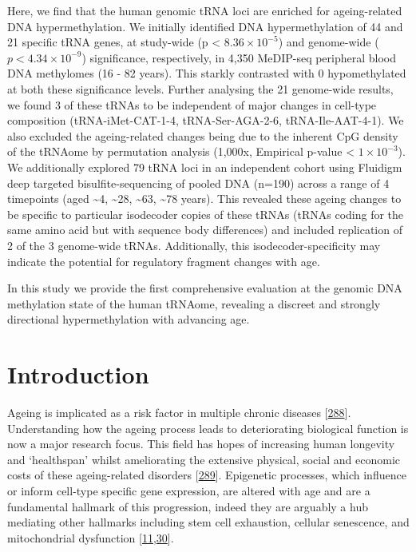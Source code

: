 \documentclass[
]{book}
\begin{document}
Here, we find that the human genomic tRNA loci are enriched for ageing-related DNA hypermethylation.
We initially identified DNA hypermethylation of 44 and 21 specific tRNA genes, at study-wide (p \textless{} \(8.36\times10^{-5}\)) and genome-wide (\(p < 4.34\times10^{-9}\)) significance, respectively, in 4,350 MeDIP-seq peripheral blood DNA methylomes (16 - 82 years).
This starkly contrasted with 0 hypomethylated at both these significance levels.
Further analysing the 21 genome-wide results, we found 3 of these tRNAs to be independent of major changes in cell-type composition (tRNA-iMet-CAT-1-4, tRNA-Ser-AGA-2-6, tRNA-Ile-AAT-4-1).
We also excluded the ageing-related changes being due to the inherent CpG density of the tRNAome by permutation analysis (1,000x, Empirical p-value \textless{} \(1\times10^{-3}\)).
We additionally explored 79 tRNA loci in an independent cohort using Fluidigm deep targeted bisulfite-sequencing of pooled DNA (n=190) across a range of 4 timepoints (aged \textasciitilde4, \textasciitilde28, \textasciitilde63, \textasciitilde78 years).
This revealed these ageing changes to be specific to particular isodecoder copies of these tRNAs (tRNAs coding for the same amino acid but with sequence body differences) and included replication of 2 of the 3 genome-wide tRNAs.
Additionally, this isodecoder-specificity may indicate the potential for regulatory fragment changes with age.

In this study we provide the first comprehensive evaluation at the genomic DNA methylation state of the human tRNAome, revealing a discreet and strongly directional hypermethylation with advancing age.

\newpage

\hypertarget{tRNA-Introduction}{%
\section{Introduction}\label{tRNA-Introduction}}

Ageing is implicated as a risk factor in multiple chronic diseases {[}\protect\hyperlink{ref-Partridge2018}{288}{]}.
Understanding how the ageing process leads to deteriorating biological function is now a major research focus. This field has hopes of increasing human longevity and `healthspan' whilst ameliorating the extensive physical, social and economic costs of these ageing-related disorders {[}\protect\hyperlink{ref-Campisi2019}{289}{]}.
Epigenetic processes, which influence or inform cell-type specific gene expression, are altered with age and are a fundamental hallmark of this progression, indeed they are arguably a hub mediating other hallmarks including stem cell exhaustion, cellular senescence, and mitochondrial dysfunction {[}\protect\hyperlink{ref-Lopez-Otin2013}{11},\protect\hyperlink{ref-Booth2016}{30}{]}.
\end{document}
